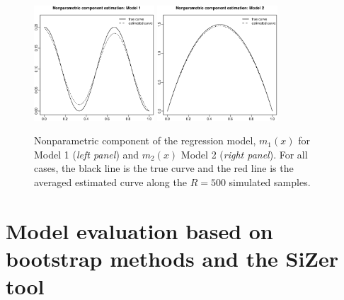 \documentclass[sn-mathphys]{sn-jnl}%
\theoremstyle{thmstyleone}%
\theoremstyle{thmstyletwo}%
\theoremstyle{thmstylethree}%
\begin{document}
\begin{figure}[ht]
	\centerline{\includegraphics [width=0.4\textwidth]{Fig12_sim1.eps}
		          \includegraphics [width=0.4\textwidth]{Fig12_sim2.eps} }
	\caption{Nonparametric component of the regression model,  $m_1(x)$ for Model 1 ({\it left panel}) and $m_2(x)$ Model 2 ({\it right panel}). For all cases, the black line is the true curve and the red line is the averaged estimated curve along the $R=500$ simulated samples.}
	\label{fig:estim_m}
\end{figure}

\section{Model evaluation based on bootstrap methods and the SiZer tool}\label{sec:sizer}
\end{document}
